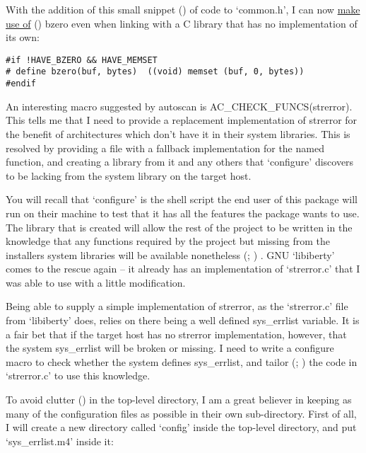 With the addition of this small snippet ({\MbQ{}}) of code to `common.h', I can 
now \underline{make use of} ({\MaQ{}}) bzero even when linking with a C library 
that has no implementation of its own: 

\begin{Verbatim}[frame=single]
#if !HAVE_BZERO && HAVE_MEMSET
# define bzero(buf, bytes)  ((void) memset (buf, 0, bytes))
#endif
\end{Verbatim}

An interesting macro suggested by autoscan is AC\_{}CHECK\_{}FUNCS(strerror).
This tells me that I need to provide a replacement implementation of 
strerror for the benefit of architectures which don't have it in their 
system libraries. This is resolved by providing a file with a fallback 
implementation for the named function, and creating a library from it and 
any others that `configure' discovers to be lacking from the 
system library on the target host. 


You will recall that `configure' is the shell script the end user of this 
package will run on their machine to test that it has all the features 
the package wants to use. The library that is created will allow the rest 
of the project to be written in the knowledge that any functions required 
by the project but missing from the installers system libraries will be 
available nonetheless ({\MaQ{}}; {\MaQ{}}) . GNU `libiberty' comes to the 
rescue again -- it already has an implementation of `strerror.c' that I 
was able to use with a little modification. 


Being able to supply a simple implementation of strerror, as the `strerror.c' 
file from `libiberty' does, relies on there being a well 
defined sys\_{}errlist variable. It is a fair bet that if the target host 
has no strerror implementation, however, that the system sys\_{}errlist will 
be broken or missing. I need to write a configure macro to check whether 
the system defines sys\_{}errlist, and tailor ({\MaQ{}}; {\MaQ{}}) the code 
in `strerror.c' to use this knowledge. 


To avoid clutter ({\MdQ{}}) in the top-level directory, I am a great believer in 
keeping as many of the configuration files as possible in their own 
sub-directory. First of all, I will create a new directory called `config' 
inside the top-level directory, and put `sys\_{}errlist.m4' inside it: 

